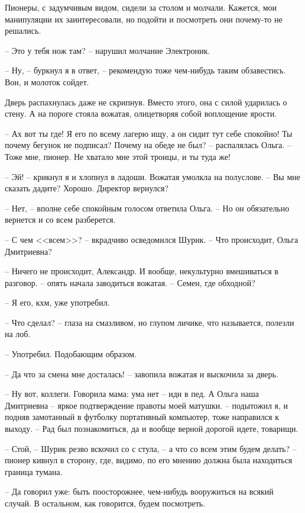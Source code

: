 \documentclass[a4paper]{book}
\begin{document}
Пионеры, с задумчивым видом, сидели за столом и молчали. Кажется, мои манипуляции их заинтересовали, но подойти и посмотреть они почему-то не решались.

-- Это у тебя нож там? -- нарушил молчание Электроник. 

-- Ну, -- буркнул я в ответ, -- рекомендую тоже чем-нибудь таким обзавестись. Вон, и молоток сойдет.

Дверь распахнулась даже не скрипнув. Вместо этого, она с силой ударилась о стену. А на пороге стояла вожатая, олицетворяя собой воплощение ярости.

-- Ах вот ты где! Я его по всему лагерю ищу, а он сидит тут себе спокойно! Ты почему бегунок не подписал? Почему на обеде не был? -- распалялась Ольга. -- Тоже мне, пионер. Не хватало мне этой троицы, и ты туда же!

-- Эй! -- крикнул я и хлопнул в ладоши. Вожатая умолкла на полуслове. -- Вы мне сказать дадите? Хорошо. Директор вернулся?

-- Нет, -- вполне себе спокойным голосом ответила Ольга. -- Но он обязательно вернется и со всем разберется. 

-- С чем <<всем>>? -- вкрадчиво осведомился Шурик. -- Что происходит, Ольга Дмитриевна?

-- Ничего не происходит, Александр. И вообще, некультурно вмешиваться в разговор. -- опять начала заводиться вожатая. -- Семен, где обходной?

-- Я его, кхм, уже употребил.

-- Что сделал? -- глаза на смазливом, но глупом личике, что называется, полезли на лоб.

-- Употребил. Подобающим образом.

-- Да что за смена мне досталась! -- завопила вожатая и выскочила за дверь.

-- Ну вот, коллеги. Говорила мама: ума нет -- иди в пед. А Ольга наша Дмитриевна -- яркое подтверждение правоты моей матушки. -- подытожил я, и подняв замотанный в футболку портативный компьютер, тоже направился к выходу. -- Рад был познакомиться, да и вообще верной дорогой идете, товарищи. 

-- Стой, -- Шурик резво вскочил со с стула, -- а что со всем этим будем делать? -- пионер кивнул в сторону, где, видимо, по его мнению должна была находиться граница тумана.

-- Да говорил уже: быть поосторожнее, чем-нибудь вооружиться на всякий случай. В остальном, как говорится, будем посмотреть.
\end{document}
